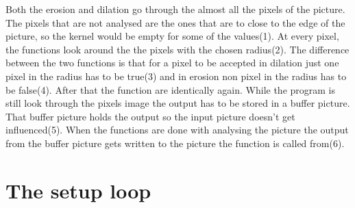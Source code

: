 Both the erosion and dilation go through the almost all the pixels of the picture. The pixels that are not analysed are the ones that are to close to the edge of the picture, so the kernel would be empty for some of the values(1). At every pixel, the functions look around the the pixels with the chosen radius(2). The difference between the two functions is that for a pixel to be accepted in dilation just one pixel in the radius has to be true(3) and in erosion non pixel in the radius has to be false(4). After that the function are identically again. While the program is still look through the pixels image the output has to be stored in a buffer picture. That buffer picture holds the output so the input picture doesn't get influenced(5). When the functions are done with analysing the picture the output from the buffer picture gets written to the picture the function is called from(6). 

\section{The setup loop}

